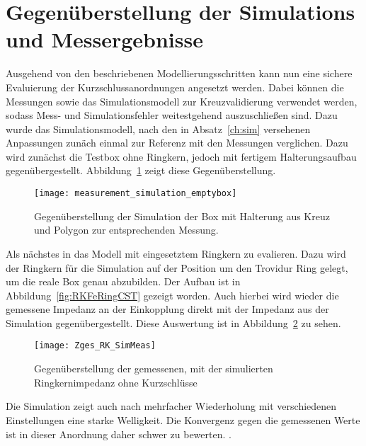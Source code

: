 \section{Gegen\"uberstellung der Simulations und Messergebnisse}
Ausgehend von den beschriebenen Modellierungsschritten kann nun eine sichere Evaluierung der Kurzschlussanordnungen angesetzt werden. Dabei k\"onnen die Messungen sowie das Simulationsmodell zur Kreuzvalidierung verwendet werden, sodass Mess- und Simulationsfehler weitestgehend auszuschlie\ss{}en sind. Dazu wurde das Simulationsmodell, nach den in Absatz~\ref{ch:sim} versehenen Anpassungen zun\"ach einmal zur Referenz mit den Messungen verglichen. Dazu wird zun\"achst die Testbox ohne Ringkern, jedoch mit fertigem Halterungsaufbau gegen\"ubergestellt. Abbildung~\ref{fig:boxpolycross} zeigt diese Gegen\"uberstellung.
\begin{figure}[htb]
	\centering
	\texttt{[image: measurement\_simulation\_emptybox]}
	\caption{Gegen\"uberstellung der Simulation der Box mit Halterung aus Kreuz und Polygon zur entsprechenden Messung.}
	\label{fig:boxpolycross}
\end{figure}
\par
Als n\"achstes in das Modell mit eingesetztem Ringkern zu evalieren. Dazu wird der Ringkern f\"ur die Simulation auf der Position um den Trovidur Ring gelegt, um die reale Box genau abzubilden. Der Aufbau ist in Abbildung~\ref{fig:RKFeRingCST} gezeigt worden. Auch hierbei wird wieder die gemessene Impedanz an der Einkopplung direkt mit der Impedanz aus der Simulation gegen\"ubergestellt. Diese Auswertung ist in Abbildung~\ref{fig:boxpolycrossrk} zu sehen.



\newpage



\begin{figure}[htb]
	\centering
	\texttt{[image: Zges\_RK\_SimMeas]}
	\caption{Gegen\"uberstellung der gemessenen, mit der simulierten Ringkernimpedanz ohne Kurzschl\"usse}
	\label{fig:boxpolycrossrk}
\end{figure}
\par
Die Simulation zeigt auch nach mehrfacher Wiederholung mit verschiedenen Einstellungen eine starke Welligkeit. Die Konvergenz gegen die gemessenen Werte ist in dieser Anordnung daher schwer zu bewerten. 
.  

